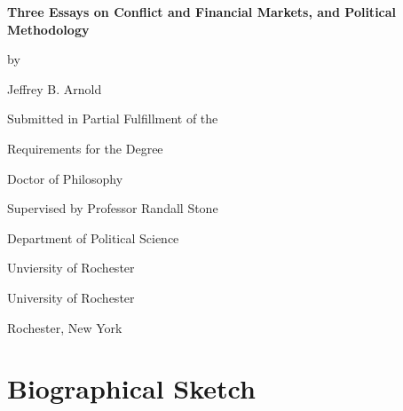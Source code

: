 \documentclass[12pt,oneside]{book}\usepackage[]{graphicx}\usepackage[]{color}
\newcommand{\myauthor}{Jeffrey B. Arnold}
\newcommand{\myinstitution}{University of Rochester}
\newcommand{\mylocation}{Rochester, New York}
\newcommand{\mytitle}{Three Essays on Conflict and Financial Markets, and Political Methodology}
\newcommand{\myadvisor}{Professor Randall Stone}
\newcommand{\myadvisorinstitution}{Unviersity of Rochester}
\newcommand{\myadvisordept}{Department of Political Science}
\newcommand{\myyear}{2016}
\begin{document}
\begin{titlepage}
  \vspace*{\fill}

  \begin{center}
    {\LARGE \bfseries \mytitle \par}

    \bigskip%
    by

    \bigskip%
    \myauthor


    \bigskip\bigskip\bigskip\bigskip%
    Submitted in Partial Fulfillment of the

    \bigskip%
    Requirements for the Degree

    \bigskip%
    Doctor of Philosophy


    \bigskip\bigskip\bigskip\bigskip%
    Supervised by \myadvisor{}

    \bigskip\bigskip%
    \myadvisordept{}

    \bigskip%
    \myadvisorinstitution{}


    \bigskip\bigskip\bigskip\bigskip%
    \myinstitution

    \bigskip%
    \mylocation{}


    \bigskip\bigskip\bigskip\bigskip%
    \myyear{}
  \end{center}

  \vspace*{\fill}
\end{titlepage}



\pagestyle{fancy}
\setcounter{page}{2}
\doublespacing

%   

\clearpage


\chapter*{Biographical Sketch}

\end{document}
